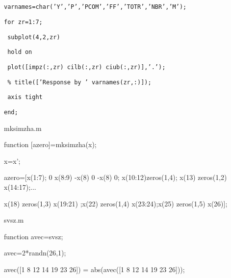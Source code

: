 \documentclass{article}
\begin{document}
\texttt{\ }

\texttt{\ }

\texttt{varnames=char('Y','P','PCOM','FF','TOTR','NBR','M');}

\texttt{for zr=1:7;}

\texttt{\ subplot(4,2,zr)}

\texttt{\ hold on}

\texttt{\ plot([impz(:,zr) cilb(:,zr) ciub(:,zr)],'.');}

\texttt{\ \% title(['Response by ' varnames(zr,:)]); }

\texttt{\ axis tight}

\texttt{end;}

\bigskip

\bigskip

{\Large mksimzha.m}

function [azero]=mksimzha(x);

x=x';

azero=[x(1:7); 0 x(8:9) -x(8) 0 -x(8) 0; x(10:12)zeros(1,4); x(13)
zeros(1,2) x(14:17);...

x(18) zeros(1,3) x(19:21) ;x(22) zeros(1,4) x(23:24);x(25) zeros(1,5) x(26)];

\bigskip

{\Large svsz.m}

function avec=svsz;

avec=2*randn(26,1);

avec([1 8 12 14 19 23 26]) = abs(avec([1 8 12 14 19 23 26]));
\end{document}
